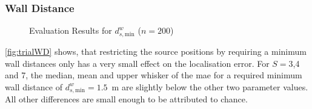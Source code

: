 \subsubsection*{Wall Distance}

\begin{figure}[H]
\iftoggle{quick}{%
    \texttt{[image: plots/boxplots/boxplot-joined-wd]}
}{%
    
}   
	\caption[Evaluation Results for $d^w_{s,\text{min}}$]{Evaluation Results for $d^w_{s,\text{min}}$ ($n=200$)}
	\label{fig:trialWD}
\end{figure}

\autoref{fig:trialWD} shows, that restricting the source positions by requiring a minimum wall distances only has a very small effect on the localisation error. For $S=3$,4 and 7, the median, mean and upper whisker of the \gls{mae} for a required minimum wall distance of $d_{s,\text{min}}^w=1.5$~m are slightly below the other two parameter values. All other differences are small enough to be attributed to chance.